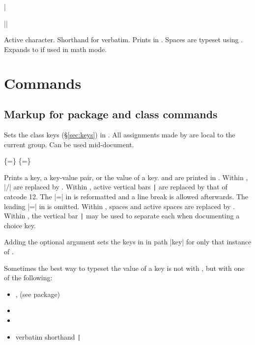 \documentclass{beerydoc}
\begin{document}
\begin{codedoc}{|}
  \begin{syntax}
    \string|\string|
  \end{syntax}
  Active character.
  Shorthand for verbatim.
  Prints  in .
  Spaces are typeset using .
  Expands to  if used in math mode.
\end{codedoc}


\section{Commands}
\label{sec:cmds}

\subsection{Markup for package and class commands}
\label{subsec:clsmarkup}

\begin{codedoc}{\beerydocsetup}
  \begin{syntax}
     
  \end{syntax}
  Sets the  class keys (\S\ref{sec:keys}) in
  .
  All assignments made by  are local to the current group.
  Can be used mid-document.
\end{codedoc}

\begin{codedoc}{\key}
  \begin{syntax}
      
      \{=\}
      \{=\}
  \end{syntax}
  Prints a key, a key-value pair, or the value of a key.
   and  are printed in .
  Within , |/| are replaced by .
  Within , active vertical bars \texttt{\string|} are replaced by
  that of catcode 12.
  The |=| in  is reformatted and a line break is
  allowed afterwards.
  The leading |=| in  is omitted.
  Within , spaces and active spaces are replaced by
  .
  Within , the vertical bar \texttt{\string|} may be used to
  separate each  when documenting a choice key.

  Adding the optional argument sets the keys in  in path
  |key| for only that instance of .

  Sometimes the best way to typeset the value of a key is not with
  , but with one of the following:
  \begin{itemize}
    \item {},  (see  package)
    \item {}
    \item {}
    \item verbatim shorthand \texttt{\string|}
  \end{itemize}
\end{codedoc}
\end{document}
